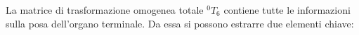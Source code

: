 \documentclass[11pt, a4paper]{article}
\begin{document}

\begin{par}
\begin{flushleft}
La matrice di trasformazione omogenea totale $^0 T_6$ contiene tutte le informazioni sulla posa dell'organo terminale. Da essa si possono estrarre due elementi chiave:
\end{flushleft}
\end{par}
\end{document}
